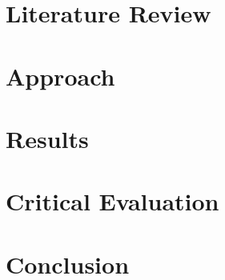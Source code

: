 \documentclass[a4paper, 12pt, hidelinks]{article}
\begin{document}
	\section{Literature Review}
	\newpage
	\section{Approach}
	\newpage	
	\section{Results}
	\newpage
	\section{Critical Evaluation}
	\newpage
	\section{Conclusion}
	\newpage
		
	\newpage
	\printacronyms
	\printglossary[type=main]
	
\end{document}
